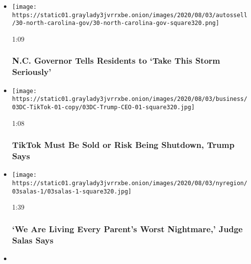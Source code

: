 \begin{itemize}
\item
  \href{https://www.nytimes3xbfgragh.onion/video/us/100000007271090/north-carolina-isaias-coronavirus.html?action=click\&module=video-series-bar\&region=header\&pgtype=Article\&playlistId=video/latest-video}{}

  \texttt{[image: https://static01.graylady3jvrrxbe.onion/images/2020/08/03/autossell/30-north-carolina-gov/30-north-carolina-gov-square320.png]}

  1:09

  \hypertarget{nc-governor-tells-residents-to-take-this-storm-seriously}{%
  \subsubsection{N.C. Governor Tells Residents to `Take This Storm
  Seriously'}\label{nc-governor-tells-residents-to-take-this-storm-seriously}}
\item
  \href{https://www.nytimes3xbfgragh.onion/video/us/100000007270771/trump-tiktok-shutdown-microsoft.html?action=click\&module=video-series-bar\&region=header\&pgtype=Article\&playlistId=video/latest-video}{}

  \texttt{[image: https://static01.graylady3jvrrxbe.onion/images/2020/08/03/business/03DC-TikTok-01-copy/03DC-Trump-CEO-01-square320.jpg]}

  1:08

  \hypertarget{tiktok-must-be-sold-or-risk-being-shutdown-trump-says}{%
  \subsubsection{TikTok Must Be Sold or Risk Being Shutdown, Trump
  Says}\label{tiktok-must-be-sold-or-risk-being-shutdown-trump-says}}
\item
  \href{https://www.nytimes3xbfgragh.onion/video/us/100000007269993/judge-salas-new-jersey.html?action=click\&module=video-series-bar\&region=header\&pgtype=Article\&playlistId=video/latest-video}{}

  \texttt{[image: https://static01.graylady3jvrrxbe.onion/images/2020/08/03/nyregion/03salas-1/03salas-1-square320.jpg]}

  1:39

  \hypertarget{we-are-living-every-parents-worst-nightmare-judge-salas-says}{%
  \subsubsection{`We Are Living Every Parent's Worst Nightmare,' Judge
  Salas
  Says}\label{we-are-living-every-parents-worst-nightmare-judge-salas-says}}
\item
  \href{https://www.nytimes3xbfgragh.onion/video/world/europe/100000007269932/who-coronavirus-briefing.html?action=click\&module=video-series-bar\&region=header\&pgtype=Article\&playlistId=video/latest-video}{}


\end{itemize}
